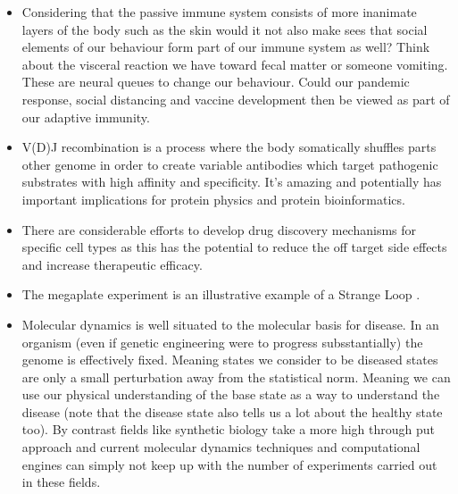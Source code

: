 \begin{itemize}
\item Considering that the passive immune system consists of more inanimate layers of the body such as the skin would it not also make sees that social elements of our behaviour form part of our immune system as well? Think about the visceral reaction we have toward fecal matter or someone vomiting. These are neural queues to change our behaviour. Could our pandemic response, social distancing and vaccine development then be viewed as part of our adaptive immunity. 

\item V(D)J recombination is a process where the body somatically shuffles parts other genome in order to create variable antibodies which target pathogenic substrates with high affinity and specificity. It's amazing and potentially has important implications for protein physics and protein bioinformatics.

\item There are considerable efforts to develop drug discovery mechanisms for specific cell types \cite{yu2020} as this has the potential to reduce the off target side effects and increase therapeutic efficacy. 

\item The megaplate experiment\cite{baym2016} is an illustrative example of a Strange Loop \cite{hofstadter2007}. 

\item Molecular dynamics is well situated to the molecular basis for disease. In an organism (even if genetic engineering were to progress subsstantially) the genome is effectively fixed. Meaning states we consider to be diseased states are only a small perturbation away from the statistical norm. Meaning we can use our physical understanding of the base state as a way to understand the disease (note that the disease state also tells us a lot about the healthy state too). By contrast fields like synthetic biology take a more high through put approach and current molecular dynamics techniques and computational engines can simply not keep up with the number of experiments carried out in these fields.  

\end{itemize}
